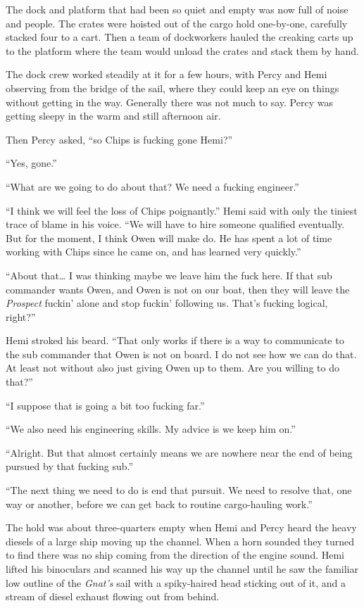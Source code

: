 \documentclass[
]{scrbook}
\begin{document}
The dock and platform that had been so quiet and empty was now full of
noise and people. The crates were hoisted out of the cargo hold
one-by-one, carefully stacked four to a cart. Then a team of dockworkers
hauled the creaking carts up to the platform where the team would unload
the crates and stack them by hand.

The dock crew worked steadily at it for a few hours, with Percy and Hemi
observing from the bridge of the sail, where they could keep an eye on
things without getting in the way. Generally there was not much to say.
Percy was getting sleepy in the warm and still afternoon air.

Then Percy asked, ``so Chips is fucking gone Hemi?''

``Yes, gone.''

``What are we going to do about that? We need a fucking engineer.''

``I think we will feel the loss of Chips poignantly.'' Hemi said with
only the tiniest trace of blame in his voice. ``We will have to hire
someone qualified eventually. But for the moment, I think Owen will make
do. He has spent a lot of time working with Chips since he came on, and
has learned very quickly.''

``About that\ldots{} I was thinking maybe we leave him the fuck here. If
that sub commander wants Owen, and Owen is not on our boat, then they
will leave the \emph{Prospect} fuckin' alone and stop fuckin' following
us. That's fucking logical, right?''

Hemi stroked his beard. ``That only works if there is a way to
communicate to the sub commander that Owen is not on board. I do not see
how we can do that. At least not without also just giving Owen up to
them. Are you willing to do that?''

``I suppose that is going a bit too fucking far.''

``We also need his engineering skills. My advice is we keep him on.''

``Alright. But that almost certainly means we are nowhere near the end
of being pursued by that fucking sub.''

``The next thing we need to do is end that pursuit. We need to resolve
that, one way or another, before we can get back to routine
cargo-hauling work.''

The hold was about three-quarters empty when Hemi and Percy heard the
heavy diesels of a large ship moving up the channel. When a horn sounded
they turned to find there was no ship coming from the direction of the
engine sound. Hemi lifted his binoculars and scanned his way up the
channel until he saw the familiar low outline of the \emph{Gnat's} sail
with a spiky-haired head sticking out of it, and a stream of diesel
exhaust flowing out from behind.
\end{document}
